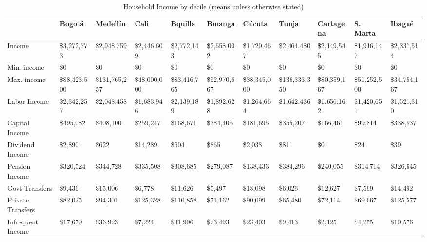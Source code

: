 \documentclass[12pt]{article}
\begin{document}
\begin{landscape}
\break

\begin{table}[]
\caption{Household Income by decile (means unless otherwise stated)}
\label{table:ycity}
\footnotesize
\begin{tabular}{lllllllllll}\\ \hline
& Bogot\'{a}                           & Medell\'{i}n     & Cali          & Bquilla & Bmanga  & C\'{u}cuta       & Tunja        & Cartagena     & S. Marta  & Ibagu\'{e}                     \\ \hline
Income                           & \$3,272,773  & \$2,948,759   & \$2,446,609  & \$2,772,143  & \$2,658,002  & \$1,720,467  & \$2,464,480   & \$2,149,545  & \$1,916,147  & \$2,337,514  \\
Min. income                   & \$0          & \$0           & \$0          & \$0          & \$0          & \$0          & \$0           & \$0          & \$0          & \$0          \\
Max. income                   & \$88,423,500 & \$131,765,257 & \$48,000,000 & \$83,416,765 & \$52,970,667 & \$38,345,000 & \$136,333,350 & \$80,359,167 & \$51,252,500 & \$34,754,167 \\
Labor Income                     & \$2,342,257  & \$2,048,458   & \$1,683,946  & \$2,139,189  & \$1,892,628  & \$1,264,664  & \$1,642,436   & \$1,656,162  & \$1,420,651  & \$1,521,310  \\
Capital Income                   & \$495,082    & \$408,100     & \$259,247    & \$168,671    & \$384,405    & \$181,695    & \$355,207     & \$166,461    & \$99,814     & \$338,837    \\
Dividend Income                  & \$2,890      & \$622         & \$14,289     & \$604        & \$865        & \$2,038      & \$811         & \$0          & \$24         & \$39         \\
Pension Income                   & \$320,524    & \$344,728     & \$335,508    & \$308,685    & \$279,087    & \$138,433    & \$384,296     & \$240,055    & \$314,714    & \$326,645    \\
Govt Transfers & \$9,436      & \$15,006      & \$6,778      & \$11,626     & \$5,497      & \$18,098     & \$6,026       & \$12,627     & \$7,599      & \$14,492     \\
Private Transfers    & \$82,025     & \$94,301      & \$125,328    & \$110,858    & \$71,162     & \$90,099     & \$65,480      & \$72,114     & \$69,067     & \$125,577    \\
Infrequent Income                & \$17,670     & \$36,923      & \$7,224      & \$31,906     & \$23,493     & \$23,403     & \$9,413       & \$2,125      & \$4,255      & \$10,576     \\

\end{tabular}
\end{table}
\end{landscape}
\end{document}
